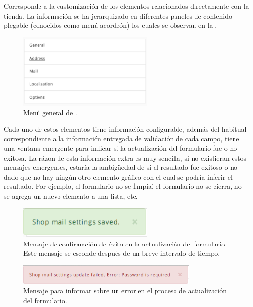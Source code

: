 Corresponde a la customización de los elementos relacionados directamente con la tienda. La información se ha jerarquizado en diferentes paneles de contenido plegable (conocidos como menú acordeón) los cuales se observan en la .
\begin{figure}[H]
	\centering
	\includegraphics[width=0.6\textwidth]{figuras/dashboard/ecommerce/main_menu.png}
	\caption{Menú general de \ecomFrameworkCoreEF.}
	\label{figure:dashboard:ecommerce:main_menu}
\end{figure}

Cada uno de estos elementos tiene información configurable, además del \feedback habitual correspondiente a la información entregada de validación de cada campo, tiene una ventana emergente para indicar si la actualización del formulario fue o no exitosa.
La rázon de esta información extra es muy sencilla, si no existieran estos mensajes emergentes, estaría la ambigüedad de si el resultado fue exitoso o no dado que no hay ningún otro elemento gráfico con el cual se podría inferir el resultado. Por ejemplo, el formulario no se \'limpia\', el formulario no se cierra, no se agrega un nuevo elemento a una lista, etc.

\begin{figure}[H]
	\centering
	\includegraphics[width=0.6\textwidth]{figuras/dashboard/ecommerce/success_message.png}
	\caption{Mensaje de confirmación de éxito en la actualización del formulario. Este mensaje se esconde después de un breve intervalo de tiempo.}
	\label{figure:dashboard:ecommerce:success_message}
\end{figure}

\begin{figure}[H]
	\centering
	\includegraphics[width=0.8\textwidth]{figuras/dashboard/ecommerce/error_message.png}
	\caption{Mensaje para informar sobre un error en el proceso de actualización del formulario.}
	\label{figure:dashboard:ecommerce:error_message}
\end{figure}

